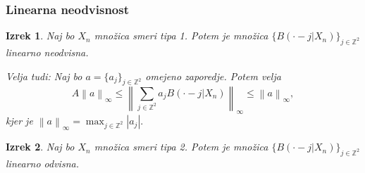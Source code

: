 \documentclass{beamer}
\def\Z{\mathbb{Z}} %
\newtheorem{izrek}{Izrek}
\begin{document}
\begin{frame}

\frametitle{Linearna neodvisnost}

\begin{izrek}
	Naj bo $X_n$ množica smeri tipa 1. Potem je množica $\{B(\cdot - j | X_n)\}_{j\in\Z^2}$ linearno neodvisna.
	
	Velja tudi: Naj bo $a = \{a_j\}_{j\in\Z^2}$ omejeno zaporedje. Potem velja $$A \left\lVert a \right\rVert_\infty \leq \left\lVert \sum_{j\in\Z^2} a_j B(\cdot - j | X_n) \right\rVert_\infty \leq \left\lVert a \right\rVert_\infty,$$ kjer je $\left\lVert a \right\rVert_\infty = \max_{j\in\Z^2}|a_j|.$
\end{izrek}

\pause

\begin{izrek}
	Naj bo $X_n$ množica smeri tipa 2. Potem je množica $\{B(\cdot - j | X_n)\}_{j\in\Z^2}$ linearno odvisna.
\end{izrek}

\end{frame}
\end{document}
